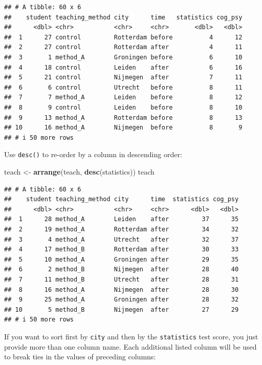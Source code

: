 \documentclass[
]{scrartcl}
\newenvironment{Shaded}{\begin{snugshade}}{\end{snugshade}}
\newcommand{\FunctionTok}[1]{\textcolor[rgb]{0.13,0.29,0.53}{\textbf{#1}}}
\newcommand{\NormalTok}[1]{#1}
\newcommand{\OtherTok}[1]{\textcolor[rgb]{0.56,0.35,0.01}{#1}}
\begin{document}
\begin{verbatim}
## # A tibble: 60 x 6
##    student teaching_method city      time   statistics cog_psy
##      <dbl> <chr>           <chr>     <chr>       <dbl>   <dbl>
##  1      27 control         Rotterdam before          4      12
##  2      27 control         Rotterdam after           4      11
##  3       1 method_A        Groningen before          6      10
##  4      18 control         Leiden    after           6      16
##  5      21 control         Nijmegen  after           7      11
##  6       6 control         Utrecht   before          8      11
##  7       7 method_A        Leiden    before          8      12
##  8       9 control         Leiden    before          8      10
##  9      13 method_A        Rotterdam before          8      13
## 10      16 method_A        Nijmegen  before          8       9
## # i 50 more rows
\end{verbatim}

Use \texttt{desc()} to re-order by a column in descending order:

\begin{Shaded}
\begin{Highlighting}[]
\NormalTok{teach }\OtherTok{\textless{}{-}} \FunctionTok{arrange}\NormalTok{(teach, }\FunctionTok{desc}\NormalTok{(statistics))}
\NormalTok{teach}
\end{Highlighting}
\end{Shaded}

\begin{verbatim}
## # A tibble: 60 x 6
##    student teaching_method city      time  statistics cog_psy
##      <dbl> <chr>           <chr>     <chr>      <dbl>   <dbl>
##  1      28 method_A        Leiden    after         37      35
##  2      19 method_A        Rotterdam after         34      32
##  3       4 method_A        Utrecht   after         32      37
##  4      17 method_B        Rotterdam after         30      33
##  5      10 method_A        Groningen after         29      35
##  6       2 method_B        Nijmegen  after         28      40
##  7      11 method_B        Utrecht   after         28      31
##  8      16 method_A        Nijmegen  after         28      30
##  9      25 method_A        Groningen after         28      32
## 10       5 method_B        Nijmegen  after         27      29
## # i 50 more rows
\end{verbatim}

If you want to sort first by \texttt{city} and then by the \texttt{statistics} test score, you just provide more than one column name. Each additional listed column will be used to break ties in the values of preceding columns:
\end{document}
